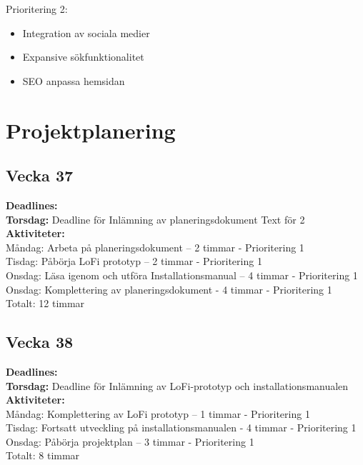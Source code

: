 \documentclass{TDP003mall}
\begin{document}
Prioritering 2:
\begin{itemize}
\item{Integration av sociala medier}
\item{Expansive sökfunktionalitet}
\item{SEO anpassa hemsidan}
\end{itemize}

\section{Projektplanering}\label{Projektplanering}
\subsection{Vecka 37}

\textbf{Deadlines:}\\
\textbf{{\color{red}Torsdag:}} Deadline för Inlämning av planeringsdokument Text för 2 \\


\textbf{Aktiviteter:}  \\
Måndag: Arbeta på planeringsdokument – 2 timmar - Prioritering 1 \\
Tisdag: Påbörja LoFi prototyp – 2 timmar - Prioritering 1 \\
Onsdag: Läsa igenom och utföra Installationsmanual – 4 timmar - Prioritering 1 \\
Onsdag: Komplettering av planeringsdokument - 4 timmar - Prioritering 1 \\

Totalt: 12 timmar

\subsection{Vecka 38}

\textbf{Deadlines:}\\
\textbf{{\color{red}Torsdag:}} Deadline för Inlämning av LoFi-prototyp och installationsmanualen\\

\textbf{Aktiviteter:} \\
Måndag: Komplettering av LoFi prototyp – 1 timmar - Prioritering 1\\
Tisdag: Fortsatt utveckling på installationsmanualen - 4 timmar - Prioritering 1\\
Onsdag: Påbörja projektplan – 3 timmar - Prioritering 1\\

Totalt: 8 timmar
\end{document}
